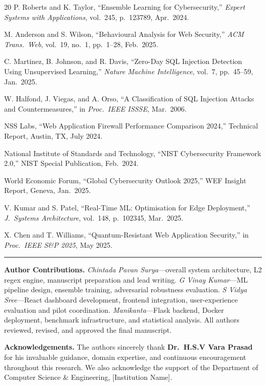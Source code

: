 \documentclass[10pt,twocolumn]{article}
\begin{document}
\begin{thebibliography}{20}
P. Roberts and K. Taylor, ``Ensemble Learning for Cybersecurity,''
\textit{Expert Systems with Applications}, vol.~245, p.~123789,
Apr.\ 2024.

M. Anderson and S. Wilson, ``Behavioural Analysis for Web Security,''
\textit{ACM Trans.\ Web}, vol.~19, no.~1, pp.~1--28, Feb.\ 2025.

C. Martinez, B. Johnson, and R. Davis, ``Zero-Day SQL Injection
Detection Using Unsupervised Learning,''
\textit{Nature Machine Intelligence}, vol.~7, pp.~45--59, Jan.\ 2025.

W. Halfond, J. Viegas, and A. Orso, ``A Classification of SQL
Injection Attacks and Countermeasures,'' in \textit{Proc.\ IEEE
ISSSE}, Mar.\ 2006.

NSS Labs, ``Web Application Firewall Performance Comparison 2024,''
Technical Report, Austin, TX, July 2024.

National Institute of Standards and Technology, ``NIST Cybersecurity
Framework 2.0,'' NIST Special Publication, Feb.\ 2024.

World Economic Forum, ``Global Cybersecurity Outlook 2025,''
WEF Insight Report, Geneva, Jan.\ 2025.

V. Kumar and S. Patel, ``Real-Time ML: Optimisation for Edge
Deployment,'' \textit{J.\ Systems Architecture}, vol.~148,
p.~102345, Mar.\ 2025.

X. Chen and T. Williams, ``Quantum-Resistant Web Application
Security,'' in \textit{Proc.\ IEEE S\&P 2025}, May 2025.

\end{thebibliography}

\vspace{6pt}
\noindent\rule{\columnwidth}{0.4pt}
\vspace{3pt}

{\small\noindent\textbf{Author Contributions.}
\textit{Chintada Pavan Surya}---overall system architecture, L2 regex
engine, manuscript preparation and lead writing.
\textit{G Vinay Kumar}---ML pipeline design, ensemble training,
adversarial robustness evaluation.
\textit{S Vidya Sree}---React dashboard development, frontend
integration, user-experience evaluation and pilot coordination.
\textit{Manikanta}---Flask backend, Docker deployment, benchmark
infrastructure, and statistical analysis.
All authors reviewed, revised, and approved the final manuscript.

\vspace{3pt}
\noindent\textbf{Acknowledgements.}
The authors sincerely thank \textbf{Dr.\ H.S.V Vara Prasad} for his
invaluable guidance, domain expertise, and continuous encouragement
throughout this research. We also acknowledge the support of the
Department of Computer Science \& Engineering, [Institution Name].
}
\end{document}
